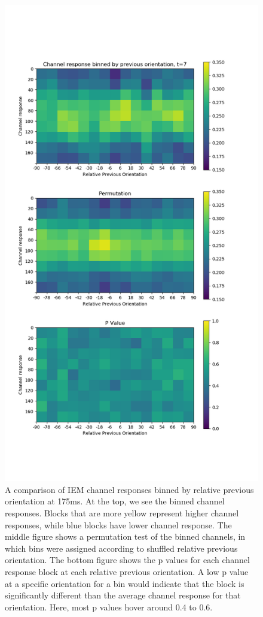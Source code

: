 \documentclass[../main.tex]{subfiles}
\begin{document}
\begin{figure}
    \centering
    \includegraphics[scale=0.45]{figures/results/sd_all_t7.png}
    \caption{A comparison of IEM channel responses binned by relative previous orientation at 175ms. At the top, we see the binned channel responses. Blocks that are more yellow represent higher channel responses, while blue blocks have lower channel response. The middle figure shows a permutation test of the binned channels, in which bins were assigned according to shuffled relative previous orientation. The bottom figure shows the p values for each channel response block at each relative previous orientation. A low p value at a specific orientation for a bin would indicate that the block is significantly different than the average channel response for that orientation. Here, most p values hover around 0.4 to 0.6. }
    \label{sd_all_t7}
\end{figure}
\end{document}

